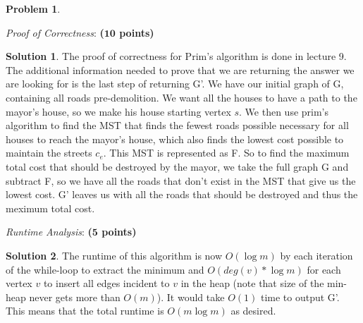 \documentclass{article}
\theoremstyle{definition}
\newtheorem{problem}{Problem}
\newtheorem*{solution*}{Solution}
\newenvironment{solution}{\begin{solution*}}{{} \end{solution*}}
\newcommand{\grade}[1]{\hfill{\textbf{($\mathbf{#1}$ points)}}}
\begin{document}
\begin{problem}
\begin{enumerate}
	\newpage
	\item[(b)] \emph{Proof of Correctness}: \grade{10} 
	
\begin{solution}
	\item The proof of correctness for Prim's algorithm is done in lecture 9. The additional information needed to prove that we are returning the answer we are looking for is the last step of returning G'. We have our initial graph of G, containing all roads pre-demolition. We want all the houses to have a path to the mayor's house, so we make his house starting vertex $s$. We then use prim's algorithm to find the MST that finds the fewest roads possible necessary for all houses to reach the mayor's house, which also finds the lowest cost possible to maintain the streets $c_e$. This MST is represented as F. So to find the maximum total cost that should be destroyed by the mayor, we take the full graph G and subtract F, so we have all the roads that don't exist in the MST that give us the lowest cost. G' leaves us with all the roads that should be destroyed and thus the meximum total cost. 
\end{solution}


\bigskip


	\item[(c)] \emph{Runtime Analysis}: \grade{5} 
	
	
\begin{solution}
	The runtime of this algorithm is now $O(\log m)$ by each iteration of the while-loop to extract the minimum and $O(deg(v)*\log m)$ for each vertex $v$ to insert all edges incident to $v$ in the heap (note that size of the min-heap never gets more than $O(m)$).  It would take $O(1)$ time to output G'. This means that the total runtime is $O(m\log m)$ as desired. 
\end{solution}

\end{enumerate}
	
	
\end{problem}
\newpage
\end{document}
